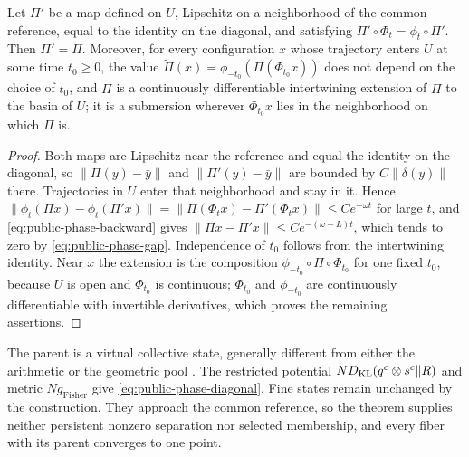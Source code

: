 Let $\Pi'$ be a map defined on $U$, Lipschitz on a neighborhood of the common reference, equal to the identity on the diagonal, and satisfying $\Pi'\circ\Phi_t=\phi_t\circ\Pi'$. Then $\Pi'=\Pi$. Moreover, for every configuration $x$ whose trajectory enters $U$ at some time $t_0\ge0$, the value $\widetilde\Pi(x)=\phi_{-t_0}(\Pi(\Phi_{t_0} x))$ does not depend on the choice of $t_0$, and $\widetilde\Pi$ is a continuously differentiable intertwining extension of $\Pi$ to the basin of $U$; it is a submersion wherever $\Phi_{t_0} x$ lies in the neighborhood on which $\Pi$ is.
\begin{proof}
Both maps are Lipschitz near the reference and equal the identity on the diagonal, so $\|\Pi(y)-\bar y\|$ and $\|\Pi'(y)-\bar y\|$ are bounded by $C\|\delta(y)\|$ there. Trajectories in $U$ enter that neighborhood and stay in it. Hence $\|\phi_t(\Pi x)-\phi_t(\Pi'x)\|=\|\Pi(\Phi_tx)-\Pi'(\Phi_tx)\|\le Ce^{-\omega t}$ for large $t$, and \cref{eq:public-phase-backward} gives $\|\Pi x-\Pi'x\|\le Ce^{-(\omega-L)t}$, which tends to zero by \cref{eq:public-phase-gap}. Independence of $t_0$ follows from the intertwining identity. Near $x$ the extension is the composition $\phi_{-t_0}\circ\Pi\circ\Phi_{t_0}$ for one fixed $t_0$, because $U$ is open and $\Phi_{t_0}$ is continuous; $\Phi_{t_0}$ and $\phi_{-t_0}$ are continuously differentiable with invertible derivatives, which proves the remaining assertions.
\end{proof}

The parent is a virtual collective state, generally different from either the arithmetic or the geometric pool \citep{GenestZidek1986,Abbas2009}. The restricted potential $ND_{\mathrm{KL}}(q^c\otimes s^c\Vert R)$ and metric $Ng_{\mathrm{Fisher}}$ give \cref{eq:public-phase-diagonal}. Fine states remain unchanged by the construction. They approach the common reference, so the theorem supplies neither persistent nonzero separation nor selected membership, and every fiber with its parent converges to one point.


